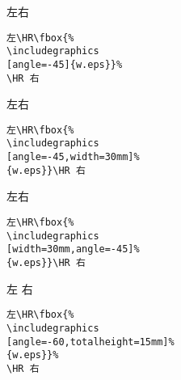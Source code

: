 \begin{minipage}[c]{.45\textwidth}
	左\HR{}\HR 右
\end{minipage}%
\hspace{-.5cm}
\begin{minipage}[c]{.5\textwidth}
\begin{Verbatim}[frame=lines,label=\colorbox{green}{\small 例五},labelposition=topline,formatcom=\color{VerbatimColor}]
左\HR\fbox{%
\includegraphics
[angle=-45]{w.eps}}%
\HR 右
\end{Verbatim}
\end{minipage}

\begin{minipage}[c]{.45\textwidth}
	左\HR{}\HR 右
\end{minipage}%
\hspace{-.5cm}
\begin{minipage}[c]{.5\textwidth}
\begin{Verbatim}[frame=lines,label=\colorbox{green}{\small 例六},labelposition=topline,formatcom=\color{VerbatimColor}]
左\HR\fbox{%
\includegraphics
[angle=-45,width=30mm]%
{w.eps}}\HR 右
\end{Verbatim}
\end{minipage}

\hspace{-1cm}
\begin{minipage}[c]{.45\textwidth}
	左\HR{}\HR 右
\end{minipage}%
\begin{minipage}[c]{.5\textwidth}
\begin{Verbatim}[frame=lines,label=\colorbox{green}{\small 例七},labelposition=topline,formatcom=\color{VerbatimColor}]
左\HR\fbox{%
\includegraphics
[width=30mm,angle=-45]%
{w.eps}}\HR 右
\end{Verbatim}
\end{minipage}

\begin{minipage}[c]{.45\textwidth}
	左\HR{}%
	\HR 右
\end{minipage}%
\hspace{-.5cm}
\begin{minipage}[c]{.5\textwidth}
\begin{Verbatim}[frame=lines,label=\colorbox{green}{\small 例八},labelposition=topline,formatcom=\color{VerbatimColor}]
左\HR\fbox{%
\includegraphics
[angle=-60,totalheight=15mm]%
{w.eps}}%
\HR 右
\end{Verbatim}
\end{minipage}

